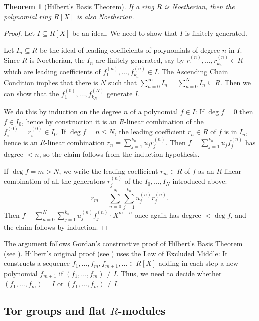 \documentclass{amsart}
\theoremstyle{plain}
\newtheorem{thm}{Theorem}[section]
\numberwithin{equation}{section} %
\numberwithin{figure}{section} %
\theoremstyle{plain}
\theoremstyle{plain}
\theoremstyle{plain}
\theoremstyle{plain}
\theoremstyle{plain}
\theoremstyle{plain}
\theoremstyle{remark}
\theoremstyle{remark}
\theoremstyle{remark}
\begin{document}
\begin{thm}[Hilbert's Basis Theorem]
If a ring $R$ is Noetherian, then the polynomial ring $R[X]$ is also Noetherian.
\end{thm}
\begin{proof}
Let $I \subseteq R[X]$ be an ideal. We need to show that $I$ is finitely generated.

Let $I_n \subseteq R$ be the ideal of leading coefficients of polynomials of degree $n$ in $I$. Since $R$ is Noetherian, the $I_n$ are finitely generated, say by $r_1^{(n)}, \ldots, r_{k_n}^{(n)} \in R$ which are leading coefficients of $f_1^{(n)}, \ldots, f_{k_n}^{(n)} \in I$. The Ascending Chain Condition implies that there is $N$ such that $\sum_{n=0}^\infty I_n = \sum_{n=0}^N I_n \subseteq R$. Then we can show that the $f_1^{(0)}, \ldots, f_{k_N}^{(N)}$ generate $I$.

We do this by induction on the degree $n$ of a polynomial $f \in I$: If $\deg f = 0$ then $f \in I_0$, hence by construction it is an $R$-linear combination of the $f_i^{(0)} = r_i^{(0)} \in I_0$. If $\deg f = n \leq N$, the leading coefficient $r_n \in R$ of $f$ is in $I_n$, hence is an $R$-linear combination $r_n = \sum_{j=1}^{k_n} u_j r_j^{(n)}$. Then $f - \sum_{j=1}^{k_n} u_j f_j^{(n)}$ has degree $< n$, so the claim follows from the induction hypothesis.

If $\deg f = m > N$, we write the leading coefficient $r_m \in R$ of $f$ as an $R$-linear combination of all the generators $r_j^{(n)}$ of the $I_0, \ldots, I_N$ introduced above:
\[ r_m = \sum_{n=0}^N \sum_{j=1}^{k_n} u_j^{(n)} r_j^{(n)}. \]
Then $f - \sum_{n=0}^N \sum_{j=1}^{k_n} u_j^{(n)} f_j^{(n)} \cdot X^{m - n}$ once again has degree $< \deg f$, and the claim follows by induction. 
\end{proof}

The argument follows Gordan's constructive proof of Hilbert's Basis Theorem (see \cite[Ex.15.15]{ECA}). Hilbert's original proof (see \cite[Thm.1.2]{ECA}) uses the Law of Excluded Middle: It constructs a sequence $f_1, \ldots, f_m, f_{m+1}, \ldots \in R[X]$ adding in each step a new polynomial $f_{m+1}$ if $(f_1, \ldots, f_m) \neq I$. Thus, we need to decide whether $(f_1, \ldots, f_m) = I$ or $(f_1, \ldots, f_m) \neq I$. 


\subsection{Tor groups and flat $R$-modules} 
\end{document}
